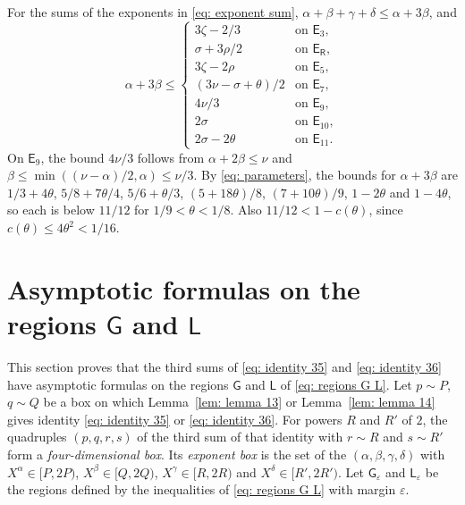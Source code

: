 \documentclass{article}
\numberwithin{equation}{section}
\newcommand{\Le}{\leqslant}
\begin{document}
For the sums of the exponents in \eqref{eq: exponent sum}, $\alpha + \beta + \gamma + \delta \Le \alpha + 3\beta$, and
\begin{equation*}
\alpha + 3\beta \Le \begin{cases} 3\zeta - 2/3 & \text{on } \mathsf{E}_3, \\ \sigma + 3\rho/2 & \text{on } \mathsf{E}_{\mathsf{R}}, \\ 3\zeta - 2\rho & \text{on } \mathsf{E}_5, \\ (3\nu - \sigma + \theta)/2 & \text{on } \mathsf{E}_7, \\ 4\nu/3 & \text{on } \mathsf{E}_9, \\ 2\sigma & \text{on } \mathsf{E}_{10}, \\ 2\sigma - 2\theta & \text{on } \mathsf{E}_{11}. \end{cases}
\end{equation*}
On $\mathsf{E}_9$, the bound $4\nu/3$ follows from $\alpha + 2\beta \Le \nu$ and $\beta \Le \min((\nu - \alpha)/2, \alpha) \Le \nu/3$. By \eqref{eq: parameters}, the bounds for $\alpha + 3\beta$ are $1/3 + 4\theta$, $5/8 + 7\theta/4$, $5/6 + \theta/3$, $(5 + 18\theta)/8$, $(7 + 10\theta)/9$, $1 - 2\theta$ and $1 - 4\theta$, so each is below $11/12$ for $1/9 < \theta < 1/8$. Also $11/12 < 1 - c(\theta)$, since $c(\theta) \Le 4\theta^2 < 1/16$.

\section{\texorpdfstring{Asymptotic formulas on the regions $\mathsf{G}$ and $\mathsf{L}$}{Asymptotic formulas on the regions G and L}}
\label{sec: four}

This section proves that the third sums of \eqref{eq: identity 35} and \eqref{eq: identity 36} have asymptotic formulas on the regions $\mathsf{G}$ and $\mathsf{L}$ of \eqref{eq: regions G L}. Let $p \sim P$, $q \sim Q$ be a box on which Lemma~\ref{lem: lemma 13} or Lemma~\ref{lem: lemma 14} gives identity \eqref{eq: identity 35} or \eqref{eq: identity 36}. For powers $R$ and $R'$ of $2$, the quadruples $(p, q, r, s)$ of the third sum of that identity with $r \sim R$ and $s \sim R'$ form a \emph{four-dimensional box}. Its \emph{exponent box} is the set of the $(\alpha, \beta, \gamma, \delta)$ with $X^{\alpha} \in [P, 2P)$, $X^{\beta} \in [Q, 2Q)$, $X^{\gamma} \in [R, 2R)$ and $X^{\delta} \in [R', 2R')$. Let $\mathsf{G}_\varepsilon$ and $\mathsf{L}_\varepsilon$ be the regions defined by the inequalities of \eqref{eq: regions G L} with margin $\varepsilon$.
\end{document}
